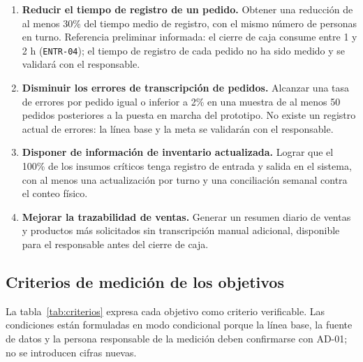 \begin{enumerate}[leftmargin=18pt,itemsep=4pt]
    \item \textbf{Reducir el tiempo de registro de un pedido.} Obtener una reducci\'on de al menos 30\% del tiempo medio de registro, con el mismo n\'umero de personas en turno. Referencia preliminar informada: el cierre de caja consume entre 1 y 2 h (\texttt{ENTR-04}); el tiempo de registro de cada pedido no ha sido medido y se validar\'a con el responsable.
    \item \textbf{Disminuir los errores de transcripci\'on de pedidos.} Alcanzar una tasa de errores por pedido igual o inferior a 2\% en una muestra de al menos 50 pedidos posteriores a la puesta en marcha del prototipo. No existe un registro actual de errores: la l\'inea base y la meta se validar\'an con el responsable.
    \item \textbf{Disponer de informaci\'on de inventario actualizada.} Lograr que el 100\% de los insumos cr\'iticos tenga registro de entrada y salida en el sistema, con al menos una actualizaci\'on por turno y una conciliaci\'on semanal contra el conteo f\'isico.
    \item \textbf{Mejorar la trazabilidad de ventas.} Generar un resumen diario de ventas y productos m\'as solicitados sin transcripci\'on manual adicional, disponible para el responsable antes del cierre de caja.
\end{enumerate}

\subsection{Criterios de medici\'on de los objetivos}
La tabla~\ref{tab:criterios} expresa cada objetivo como criterio verificable. Las condiciones est\'an formuladas en modo condicional porque la l\'inea base, la fuente de datos y la persona responsable de la medici\'on deben confirmarse con AD-01; no se introducen cifras nuevas.

